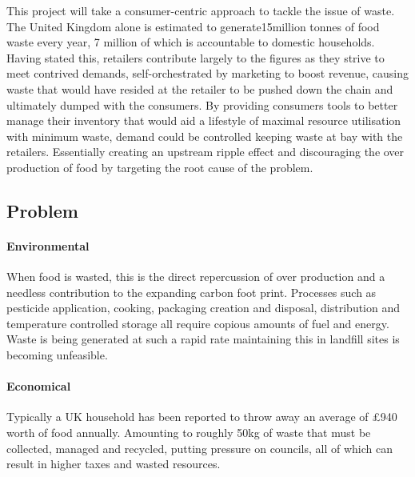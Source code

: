 \documentclass[a4paper, 11pt]{article}
\begin{document}
\vspace{\baselineskip}

This project will take a consumer-centric approach to tackle the issue of waste. The United Kingdom alone is estimated to generate15million tonnes of food waste every year, 7 million of which is accountable to domestic households. Having stated this, retailers contribute largely to the figures as they strive to meet contrived demands, self-orchestrated by marketing to boost revenue, causing waste that would have resided at the retailer to be pushed down the chain and ultimately dumped with the consumers. By providing consumers tools to better manage their inventory that would aid a lifestyle of maximal resource utilisation with minimum waste, demand could be controlled keeping waste at bay with the retailers. Essentially creating an upstream ripple effect and discouraging the over production of food by targeting the root cause of the problem.



\vspace{\baselineskip}
\vspace{\baselineskip}
\vspace{\baselineskip}

\subsection{Problem}
\paragraph{Environmental} When food is wasted, this is the direct repercussion of over production and a needless contribution to the expanding carbon foot print. Processes such as pesticide application, cooking, packaging creation and disposal, distribution and temperature controlled storage all require copious amounts of fuel and energy. Waste is being generated at such a rapid rate maintaining this in landfill sites is becoming unfeasible.

\paragraph{Economical} Typically a UK household has been reported to throw away an average of \pounds940 worth of food annually. Amounting to roughly 50kg of waste that must be collected, managed and recycled, putting pressure on councils, all of which can result in higher taxes and wasted resources.
\end{document}
